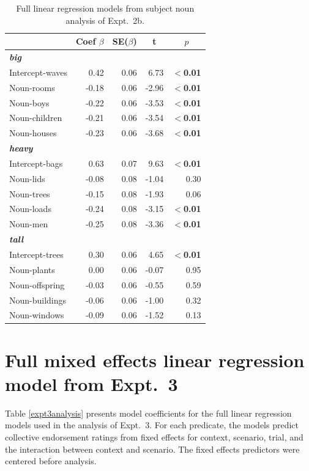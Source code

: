 \documentclass[linguex]{sp}
\begin{document}
\begin{table}[htb] 
	\centering \caption{Full linear regression models from subject noun analysis of Expt.~2b.} \label{expt2banalysis}
\begin{tabular}{lrrrr}\toprule
	&	Coef $\beta$	&	SE($\beta$)	&	\multicolumn{1}{c}{ \textbf{t}}	&	\multicolumn{1}{c}{$p$}\\ \midrule
\emph{\textbf{big}} \\
Intercept-waves& 	0.42 &	0.06	&	6.73	&	\textbf{$<$0.01} \\
Noun-rooms	&	-0.18	&   0.06	&	-2.96&	\textbf{$<$0.01} \\
Noun-boys	&	-0.22&   0.06	&	-3.53	&	\textbf{$<$0.01} \\
Noun-children	&	-0.21	&   0.06	&	-3.54	&	\textbf{$<$0.01} \\
Noun-houses	&	-0.23	&   0.06	&	-3.68	&	\textbf{$<$0.01} \\ \hline
\emph{\textbf{heavy}}\\
Intercept-bags	& 	0.63	&   0.07	&	9.63	&	\textbf{$<$0.01} \\
Noun-lids		&	-0.08	&   0.08	&	-1.04	&	0.30\\
Noun-trees	&	-0.15	&   0.08	&	-1.93	&	0.06 \\
Noun-loads	&	-0.24	&   0.08	&	-3.15	&	\textbf{$<$0.01} \\
Noun-men		&	-0.25	&   0.08	&	-3.36	&	\textbf{$<$0.01} \\ \hline
\emph{\textbf{tall}}\\
Intercept-trees	& 	0.30	&	0.06	&	4.65	&	\textbf{$<$0.01} \\
Noun-plants	&	0.00	&   0.06	&	-0.07	&	0.95 \\
Noun-offspring	&	-0.03	&   0.06	&	-0.55	&	0.59 \\
Noun-buildings	&	-0.06	&   0.06	&	-1.00	&	0.32 \\
Noun-windows	&	-0.09	&   0.06	&	-1.52	&	0.13 \\
\bottomrule
\end{tabular}
\end{table}

\section{Full mixed effects linear regression model from Expt.~3}\label{expt3results}

Table \ref{expt3analysis} presents model coefficients for the full linear regression models used in the analysis of Expt.~3. For each predicate, the models predict collective endorsement ratings from fixed effects for context, scenario, trial, and the interaction between context and scenario. The fixed effects predictors were centered before analysis.
\end{document}
